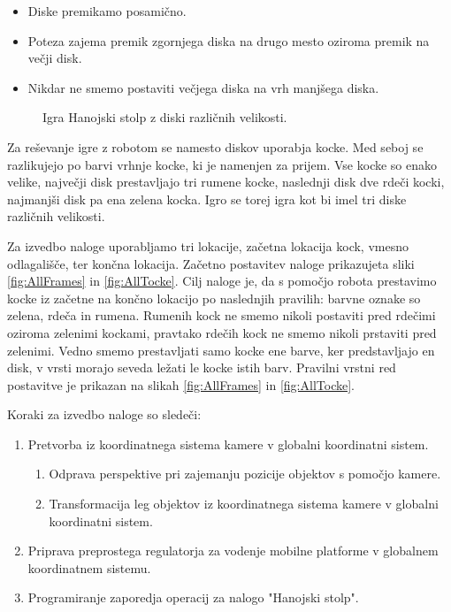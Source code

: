 \begin{itemize}
\item Diske premikamo posamično.
\item Poteza zajema premik zgornjega diska na drugo mesto oziroma premik na večji disk.
\item Nikdar ne smemo postaviti večjega diska na vrh manjšega diska.
\end{itemize}

\begin{figure}[h]
\centering {}
\caption{Igra Hanojski stolp z diski različnih velikosti.}
\label{fig:han_tower}
\end{figure}

Za reševanje igre z robotom se namesto diskov uporabja kocke. Med seboj se razlikujejo po barvi vrhnje kocke, ki je namenjen za prijem. Vse kocke so enako velike, največji disk prestavljajo tri rumene kocke, naslednji disk dve rdeči kocki, najmanjši disk pa ena zelena kocka. Igro se torej igra kot bi imel tri diske različnih velikosti.

Za izvedbo naloge uporabljamo tri lokacije, začetna lokacija kock, vmesno odlagališče, ter končna lokacija. Začetno postavitev naloge prikazujeta sliki \ref{fig:AllFrames} in \ref{fig:AllTocke}. Cilj naloge je, da s pomočjo robota prestavimo kocke iz začetne na končno lokacijo po naslednjih pravilih: barvne oznake so zelena, rdeča in rumena. Rumenih kock ne smemo nikoli postaviti pred rdečimi oziroma zelenimi kockami, pravtako  rdečih kock ne smemo nikoli prstaviti pred zelenimi. Vedno smemo prestavljati samo kocke ene barve, ker predstavljajo en disk, v vrsti morajo seveda ležati le kocke istih barv.  Pravilni vrstni red postavitve je prikazan na slikah \ref{fig:AllFrames} in \ref{fig:AllTocke}.

Koraki za izvedbo naloge so sledeči:
\begin{enumerate}
\item Pretvorba iz koordinatnega sistema kamere v globalni koordinatni sistem.
    \begin{enumerate}
    \item Odprava perspektive pri zajemanju pozicije objektov s pomočjo kamere.
    \item Transformacija leg objektov iz koordinatnega sistema kamere v globalni koordinatni sistem.
    \end{enumerate}
\item Priprava preprostega regulatorja za vodenje mobilne platforme v globalnem koordinatnem sistemu.
\item Programiranje zaporedja operacij za nalogo "Hanojski stolp".

\end{enumerate}


